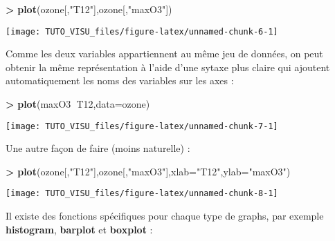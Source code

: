 \documentclass[]{book}
\newenvironment{Shaded}{\begin{snugshade}}{\end{snugshade}}
\newcommand{\DataTypeTok}[1]{\textcolor[rgb]{0.13,0.29,0.53}{#1}}
\newcommand{\KeywordTok}[1]{\textcolor[rgb]{0.13,0.29,0.53}{\textbf{#1}}}
\newcommand{\NormalTok}[1]{#1}
\newcommand{\OperatorTok}[1]{\textcolor[rgb]{0.81,0.36,0.00}{\textbf{#1}}}
\newcommand{\StringTok}[1]{\textcolor[rgb]{0.31,0.60,0.02}{#1}}
\theoremstyle{definition}
\theoremstyle{definition}
\theoremstyle{definition}
\theoremstyle{remark}
\begin{document}
\begin{Shaded}
\begin{Highlighting}[]
\OperatorTok{>}\StringTok{ }\KeywordTok{plot}\NormalTok{(ozone[,}\StringTok{"T12"}\NormalTok{],ozone[,}\StringTok{"maxO3"}\NormalTok{])}
\end{Highlighting}
\end{Shaded}

\begin{center}\texttt{[image: TUTO\_VISU\_files/figure-latex/unnamed-chunk-6-1]} \end{center}

Comme les deux variables appartiennent au même jeu de données, on peut obtenir la même représentation à l'aide d'une sytaxe plus claire qui ajoutent automatiquement les noms des variables sur les axes :

\begin{Shaded}
\begin{Highlighting}[]
\OperatorTok{>}\StringTok{ }\KeywordTok{plot}\NormalTok{(maxO3}\OperatorTok{~}\NormalTok{T12,}\DataTypeTok{data=}\NormalTok{ozone)}
\end{Highlighting}
\end{Shaded}

\begin{center}\texttt{[image: TUTO\_VISU\_files/figure-latex/unnamed-chunk-7-1]} \end{center}

Une autre façon de faire (moins naturelle) :

\begin{Shaded}
\begin{Highlighting}[]
\OperatorTok{>}\StringTok{ }\KeywordTok{plot}\NormalTok{(ozone[,}\StringTok{"T12"}\NormalTok{],ozone[,}\StringTok{"maxO3"}\NormalTok{],}\DataTypeTok{xlab=}\StringTok{"T12"}\NormalTok{,}\DataTypeTok{ylab=}\StringTok{"maxO3"}\NormalTok{)}
\end{Highlighting}
\end{Shaded}

\begin{center}\texttt{[image: TUTO\_VISU\_files/figure-latex/unnamed-chunk-8-1]} \end{center}

Il existe des fonctions spécifiques pour chaque type de graphs, par exemple \textbf{histogram}, \textbf{barplot} et \textbf{boxplot} :

\begin{Shaded}
\end{Shaded}
\end{document}
